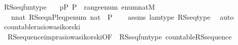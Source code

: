 \begin{isabellebody}
\isanewline
{}\isamarkupfalse%
\ RS{\isacharunderscore}{\kern0pt}seq{\isacharunderscore}{\kern0pt}funtype{\isacharcolon}{\kern0pt}\isanewline
\ \ \ {\isachardoublequoteopen}p{\isasymin}P{\isachardoublequoteclose}\ {\isachardoublequoteopen}P\ {\isasymsubseteq}\ range{\isacharparenleft}{\kern0pt}enum{\isacharparenright}{\kern0pt}{\isachardoublequoteclose}\ {\isachardoublequoteopen}enum{\isacharcolon}{\kern0pt}nat{\isasymrightarrow}M{\isachardoublequoteclose}\isanewline
\ \ \ {\isachardoublequoteopen}{\isacharparenleft}{\kern0pt}{\isasymlambda}n{\isasymin}nat{\isachardot}{\kern0pt}\ RS{\isacharunderscore}{\kern0pt}seq{\isacharparenleft}{\kern0pt}n{\isacharcomma}{\kern0pt}P{\isacharcomma}{\kern0pt}leq{\isacharcomma}{\kern0pt}p{\isacharcomma}{\kern0pt}enum{\isacharcomma}{\kern0pt}{\isasymD}{\isacharparenright}{\kern0pt}{\isacharparenright}{\kern0pt}{\isacharcolon}{\kern0pt}\ nat\ {\isasymrightarrow}\ P{\isachardoublequoteclose}\isanewline
%
\isadelimproof
\ \ %
\endisadelimproof
%
\isatagproof
{}\isamarkupfalse%
\ assms\ lam{\isacharunderscore}{\kern0pt}type\ RS{\isacharunderscore}{\kern0pt}seq{\isacharunderscore}{\kern0pt}type\ \isamarkupfalse%
\ auto%
\endisatagproof
{\isafoldproof}%
%
\isadelimproof
\isanewline
%
\endisadelimproof
\isanewline
{}\isamarkupfalse%
\ countable{\isacharunderscore}{\kern0pt}rasiowa{\isacharunderscore}{\kern0pt}sikorski\ {\isacharequal}{\kern0pt}\ \isanewline
\ \ RS{\isacharunderscore}{\kern0pt}sequence{\isacharunderscore}{\kern0pt}imp{\isacharunderscore}{\kern0pt}rasiowa{\isacharunderscore}{\kern0pt}sikorski{\isacharbrackleft}{\kern0pt}OF\ {\isacharunderscore}{\kern0pt}\ RS{\isacharunderscore}{\kern0pt}seq{\isacharunderscore}{\kern0pt}funtype\ countable{\isacharunderscore}{\kern0pt}RS{\isacharunderscore}{\kern0pt}sequence{\isacharparenleft}{\kern0pt}{}{\isacharcomma}{\kern0pt}{}{\isacharparenright}{\kern0pt}{\isacharbrackright}{\kern0pt}\isanewline
{}\isamarkupfalse%
\ \isanewline
%
\isadelimtheory
\isanewline
%
\endisadelimtheory
%
\isatagtheory
{}\isamarkupfalse%
%
\endisatagtheory
{\isafoldtheory}%
%
\isadelimtheory
%
\endisadelimtheory
%
\end{isabellebody}%
\endinput
